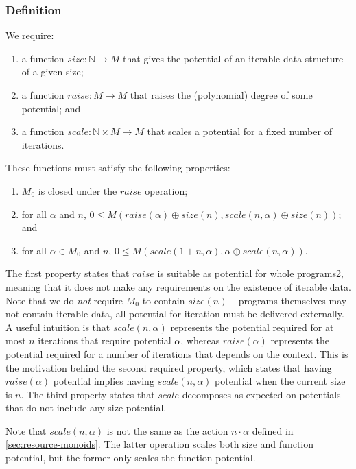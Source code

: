 \documentclass[acmsmall,screen]{acmart}
\begin{document}
\subsubsection{Definition}
We require:
\begin{enumerate}
\item a function $\mathit{size} : \mathbb{N} \to M$ that gives the
  potential of an iterable data structure of a given
  size;
\item a function $\mathit{raise} : M \to M$ that raises the
  (polynomial) degree of some potential; and
\item a function $\mathit{scale} : \mathbb{N} \times M \to M$ that
  scales a potential for a fixed number of iterations.
\end{enumerate}
These functions must satisfy the following properties:
\begin{enumerate}
\item $M_0$ is closed under the $\mathit{raise}$ operation;
\item for all $\alpha$ and $n$,
  $0 \leq M(\mathit{raise}(\alpha) \oplus \mathit{size}(n),
  \mathit{scale}(n,\alpha) \oplus \mathit{size}(n))$; and
\item for all $\alpha \in M_0$ and $n$,
  $0 \leq M(\mathit{scale}(1 + n, \alpha), \alpha \oplus
  \mathit{scale}(n, \alpha))$.
\end{enumerate}
The first property states that $\mathit{raise}$ is suitable as
potential for whole programs2, meaning that it does not make any
requirements on the existence of iterable data. Note that we do
\emph{not} require $M_0$ to contain $\mathit{size}(n)$ -- programs
themselves may not contain iterable data, all potential for iteration
must be delivered externally. A useful intuition is that
$\mathit{scale}(n,\alpha)$ represents the potential required for at
most $n$ iterations that require potential $\alpha$, whereas
$\mathit{raise}(\alpha)$ represents the potential required for a
number of iterations that depends on the context. This is the
motivation behind the second required property, which states that
having $\mathit{raise}(\alpha)$ potential implies having
$\mathit{scale}(n,\alpha)$ potential when the current size is $n$. The
third property states that $\mathit{scale}$ decomposes as expected on
potentials that do not include any size potential.

Note that $\mathit{scale}(n,\alpha)$ is not the same as the action
$n \cdot \alpha$ defined in \autoref{sec:resource-monoids}. The latter
operation scales both size and function potential, but the former only
scales the function potential.
\end{document}
